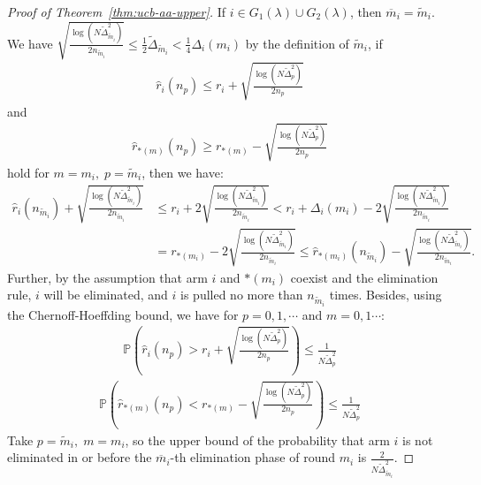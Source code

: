 \documentclass[11pt]{article}
\begin{document}
\begin{proof}[Proof of Theorem~\ref{thm:ucb-aa-upper}]
If $i\in G_1(\lambda)\cup G_2(\lambda)$, then $\overline{m}_i=\tilde{m}_i$. We have  \( \sqrt{\frac{\log(N \tilde{\Delta}_{\tilde{m}_i}^2)}{2n_{\tilde{m}_i}}} \leq \frac{1}{2}\tilde{\Delta}_{\tilde{m}_i} < \frac{1}{4}\Delta_i(m_i) \) by the definition of $\tilde{m}_i$, if \begin{align}
    \hat{r}_i(n_p) \leq r_i + \sqrt{\frac{\log(N \tilde{\Delta}_{p}^2)}{2n_{p}}} \label{suboptimal is bad A-3}
\end{align}
and  
\begin{align}
    \hat{r}_{*(m)}(n_p) \geq r_{*(m)} - \sqrt{\frac{\log(N \tilde{\Delta}_{p}^2)}{2n_{p}}} \label{optimal is good A-3}
\end{align}
hold for $m = m_i,\; p=\tilde{m}_i$, then we have:  
\begin{align*}
    \hat{r}_i(n_{\tilde{m}_i}) + \sqrt{\frac{\log(N \tilde{\Delta}_{\tilde{m}_i}^2)}{2n_{\tilde{m}_i}}} &\leq r_i + 2\sqrt{\frac{\log(N \tilde{\Delta}_{\tilde{m}_i}^2)}{2n_{\tilde{m}_i}}} < r_i + \Delta_i(m_i) - 2\sqrt{\frac{\log(N \tilde{\Delta}_{\tilde{m}_i}^2)}{2n_{\tilde{m}_i}}} \\
    &= r_{*(m_i)} - 2\sqrt{\frac{\log(N \tilde{\Delta}_{\tilde{m}_i}^2)}{2n_{\tilde{m}_i}}} \leq \hat{r}_{*(m_i)}(n_{\tilde{m}_i}) - \sqrt{\frac{\log(N \tilde{\Delta}_{\tilde{m}_i}^2)}{2n_{\tilde{m}_i}}}.
\end{align*}
Further, by the assumption that arm $i$ and $*(m_i)$ coexist and the elimination rule, \( i \) will be eliminated, and $i$ is pulled no more than $n_{\tilde{m}_i}$ times. Besides, using the Chernoff-Hoeffding bound, we have for $p=0,1,\cdots$ and $m=0,1\cdots$:
\begin{align}
    \mathbb{P}\left( \hat{r}_i(n_p) > r_i + \sqrt{\frac{\log(N \tilde{\Delta}_{p}^2)}{2n_{p}}} \right)    \leq \frac{1}{N \tilde{\Delta}_{p}^2}
    \label{suboptimal is good A-3}
\end{align}
\begin{align}
    \mathbb{P}\left( \hat{r}_{*(m)}(n_p) < r_{*(m)} - \sqrt{\frac{\log(N \tilde{\Delta}_{p}^2)}{2n_{p}}} \right) \leq \frac{1}{N \tilde{\Delta}_{p}^2} 
    \label{optimal is bad A-3}
\end{align}
Take $p=\tilde{m}_i,\; m=m_i$, so the upper bound of the probability that arm \( i \) is not eliminated in or before the $\overline{m}_i$-th elimination phase of round $m_i$ is $\frac{2}{N \tilde{\Delta}_{\tilde{m}_i}^2}$.


\end{proof}
\end{document}
